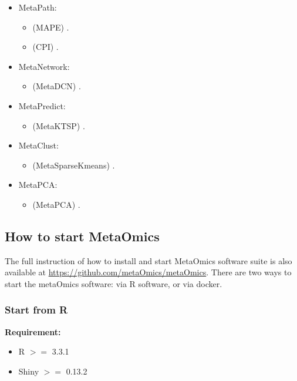 \begin{itemize}
\item MetaPath: 
\begin{itemize}
\item (MAPE) .
\item (CPI) .
\end{itemize}

\item MetaNetwork: 
\begin{itemize}
\item (MetaDCN) .
\end{itemize}

\item MetaPredict: 
\begin{itemize}
\item (MetaKTSP) .
\end{itemize}

\item MetaClust: 
\begin{itemize}
\item (MetaSparseKmeans) .
\end{itemize}

\item MetaPCA: 

\begin{itemize}
\item (MetaPCA) .
\end{itemize}

\end{itemize}



\subsection{How to start MetaOmics}

The full instruction of how to install and start MetaOmics software suite is also available at \url{https://github.com/metaOmics/metaOmics}.
There are two ways to start the metaOmics software:
via R software, or via docker.


\subsubsection{Start from R}

\textbf{Requirement:}
\begin{itemize}
\item R $>=$ 3.3.1
\item Shiny $>=$ 0.13.2
\end{itemize}

